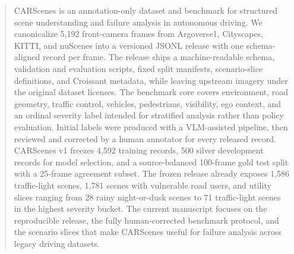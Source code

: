 \begin{abstract}
CARScenes is an annotation-only dataset and benchmark for structured scene understanding and failure analysis in autonomous driving. We canonicalize 5,192 front-camera frames from Argoverse1, Cityscapes, KITTI, and nuScenes into a versioned JSONL release with one schema-aligned record per frame. The release ships a machine-readable schema, validation and evaluation scripts, fixed split manifests, scenario-slice definitions, and Croissant metadata, while leaving upstream imagery under the original dataset licenses. The benchmark core covers environment, road geometry, traffic control, vehicles, pedestrians, visibility, ego context, and an ordinal severity label intended for stratified analysis rather than policy evaluation. Initial labels were produced with a VLM-assisted pipeline, then reviewed and corrected by a human annotator for every released record. CARScenes v1 freezes 4,592 training records, 500 silver development records for model selection, and a source-balanced 100-frame gold test split with a 25-frame agreement subset. The frozen release already exposes 1,586 traffic-light scenes, 1,781 scenes with vulnerable road users, and utility slices ranging from 28 rainy night-or-dusk scenes to 71 traffic-light scenes in the highest severity bucket. The current manuscript focuses on the reproducible release, the fully human-corrected benchmark protocol, and the scenario slices that make CARScenes useful for failure analysis across legacy driving datasets.
\end{abstract}
